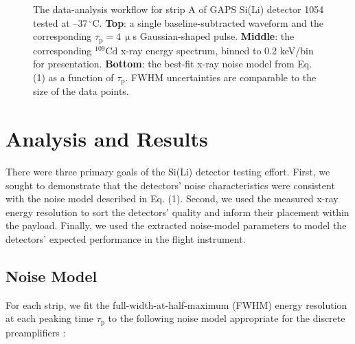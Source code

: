 \documentclass[journal]{IEEEtran}
\begin{document}
\begin{figure}
    \centering

    \hspace{-0.55cm}

    
    
    \vspace{0.25cm}




    \caption{The data-analysis workflow for strip A of GAPS Si(Li) detector 1054 tested at --37\,$^\circ\text{C}$. \textbf{Top}: a single baseline-subtracted waveform and the corresponding $\tau_\text{p} = 4\,\upmu$s Gaussian-shaped pulse. \textbf{Middle}: the corresponding $^{109}\text{Cd}$ x-ray energy spectrum, binned to 0.2 keV/bin for presentation. \textbf{Bottom}: the best-fit x-ray noise model from Eq. (1) as a function of $\tau_\text{p}$. FWHM uncertainties are comparable to the size of the data points.}
    \label{fig:workflow}
\end{figure}



\section{\label{sec:analysis_results}{Analysis and Results}}
There were three primary goals of the Si(Li) detector testing effort. First, we sought to demonstrate that the detectors' noise characteristics were consistent with the noise model described in Eq. (1). Second, we used the measured x-ray energy resolution to sort the detectors' quality and inform their placement within the payload. Finally, we used the extracted noise-model parameters to model the detectors' expected performance in the flight instrument.

\subsection{\label{sec:noisemodel}Noise Model}
For each strip, we fit the full-width-at-half-maximum (FWHM) energy resolution at each peaking time $\tau_\text{p}$ to the following noise model appropriate for the discrete preamplifiers \cite{Rogers:2019avj}:
\end{document}
